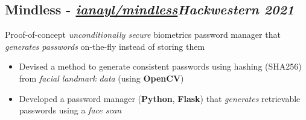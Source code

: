 \documentclass[9pt]{article}
\begin{document}

\subsection{Mindless \normalsize\textnormal{- \href{https://github.com/ianayl/mindless}{\textit{ianayl/mindless}}}\hfill \normalsize\textnormal{\textit{Hackwestern 2021}}}
    Proof-of-concept \textit{unconditionally secure} biometrics password manager that \textit{generates passwords} on-the-fly instead of storing them
    \vspace{-0.5em}
\begin{itemize}
	\item Devised a method to generate consistent passwords using hashing (SHA256) from \textit{facial landmark data} (using \textbf{OpenCV})
  \item Developed a password manager (\textbf{Python}, \textbf{Flask}) that \textit{generates} retrievable passwords using a \textit{face scan}
\end{itemize}
\vspace{-1em}
\end{document}
